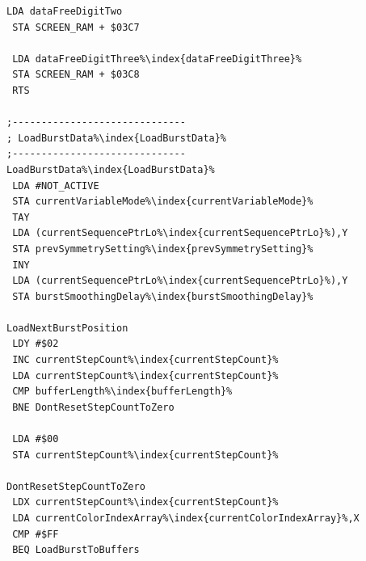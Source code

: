 \begin{minipage}[b]{0.33\linewidth}
\begin{lrbox}{\mybox}
\begin{lstlisting}[basicstyle=\ttfamily\tiny,escapechar=\%]
 LDA dataFreeDigitTwo
 STA SCREEN_RAM + $03C7

 LDA dataFreeDigitThree%\index{dataFreeDigitThree}%
 STA SCREEN_RAM + $03C8
 RTS

;------------------------------
; LoadBurstData%\index{LoadBurstData}%
;------------------------------
LoadBurstData%\index{LoadBurstData}%
 LDA #NOT_ACTIVE
 STA currentVariableMode%\index{currentVariableMode}%
 TAY
 LDA (currentSequencePtrLo%\index{currentSequencePtrLo}%),Y
 STA prevSymmetrySetting%\index{prevSymmetrySetting}%
 INY
 LDA (currentSequencePtrLo%\index{currentSequencePtrLo}%),Y
 STA burstSmoothingDelay%\index{burstSmoothingDelay}%

LoadNextBurstPosition
 LDY #$02
 INC currentStepCount%\index{currentStepCount}%
 LDA currentStepCount%\index{currentStepCount}%
 CMP bufferLength%\index{bufferLength}%
 BNE DontResetStepCountToZero

 LDA #$00
 STA currentStepCount%\index{currentStepCount}%

DontResetStepCountToZero
 LDX currentStepCount%\index{currentStepCount}%
 LDA currentColorIndexArray%\index{currentColorIndexArray}%,X
 CMP #$FF
 BEQ LoadBurstToBuffers

\end{lstlisting}
\end{lrbox}%
\scalebox{0.8}{\usebox{\mybox}}
\end{minipage}
\hspace{-0.1cm}
